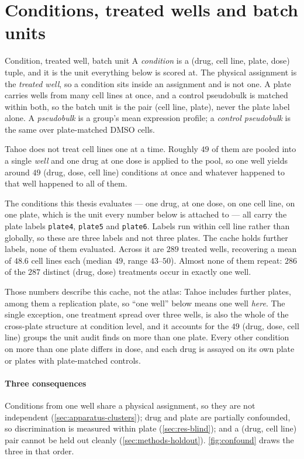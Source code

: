 \section{Conditions, treated wells and batch units}
\begin{defn}{Condition, treated well, batch unit}
  A \emph{condition} is a (drug, cell line, plate, dose) tuple, and it is the unit
  everything below is scored at. The physical assignment is the \emph{treated
  well}, so a condition sits inside an assignment and is not one. A plate carries wells from many cell lines at once, and a control pseudobulk is
  matched within both, so the batch unit is the pair (cell line, plate), never the
  plate label alone. A \emph{pseudobulk} is a group's mean
  expression profile; a \emph{control pseudobulk} is the same over plate-matched
  DMSO cells.
  \end{defn}

Tahoe does not treat cell lines one at a time. Roughly $49$ of them are pooled
into a single \emph{well} and one drug at one dose is applied to the pool, so
one well yields around $49$ (drug, dose, cell line) conditions at once and
whatever happened to that well happened to all of them.

The conditions this thesis evaluates --- one drug, at one dose, on one cell
line, on one plate, which is the unit every number below is attached to ---
all carry the plate labels \texttt{plate4}, \texttt{plate5} and \texttt{plate6}.
Labels run within cell line rather than globally, so these are three labels and
not three plates. The cache holds further labels, none of them evaluated.
Across it are $289$ treated wells, recovering a mean of $48.6$ cell lines each
(median $49$, range $43$--$50$). Almost none of them repeat: $286$ of the $287$
distinct (drug, dose) treatments occur in exactly one well.

Those numbers describe this cache, not the atlas: Tahoe includes further plates,
among them a replication plate, so ``one well'' below means one well
\emph{here}. The single exception, one treatment spread over three wells, is
also the whole of the cross-plate structure at condition level, and it accounts
for the $49$ (drug, dose, cell line) groups the unit audit finds on more than
one plate. Every other condition on more than one plate differs in dose, and
each drug is assayed on its own plate or plates with plate-matched controls.

\paragraph{Three consequences} Conditions from one well share a physical
assignment, so they are not independent (\cref{sec:apparatus-clusters}); drug
and plate are partially confounded, so discrimination is measured within plate
(\cref{sec:res-blind}); and a (drug, cell line) pair cannot be held out cleanly
(\cref{sec:methods-holdout}). \cref{fig:confound} draws the three in that
order.

